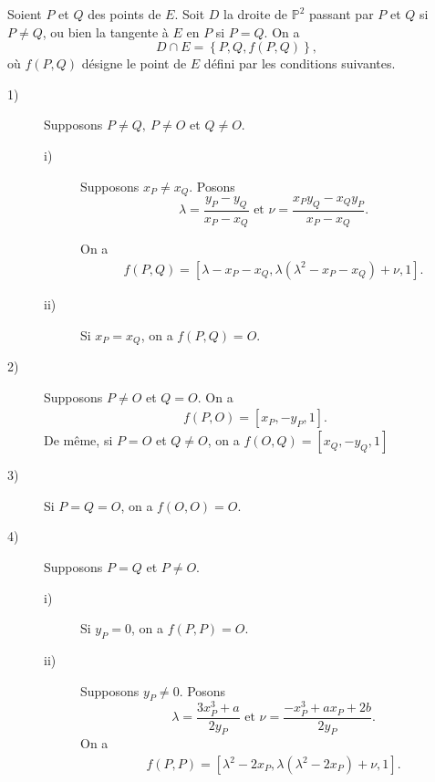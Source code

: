 \begin{proposition}
    \label{prop:secTanAlg}
    
    Soient $P$ et $Q$ des points de $E$. Soit $D$ la droite de $\mathbb{P}^2$ passant par $P$ et $Q$ si $P \neq Q$, ou bien la tangente à $E$ en $P$ si $P = Q$. On a
    \[
    D \cap E = \left\{ P, Q, f(P,Q) \right\}
    ,\] 
    où $f(P,Q)$ désigne le point de $E$ défini par les conditions suivantes.
    \begin{description}
        \item[1)] Supposons $P \neq Q, \ P \neq O$ et $Q \neq O$.
            \begin{description}
                \item[i)] Supposons $x_{P} \neq x_{Q}$. Posons
                    \[
                    \lambda = \frac{y_{P} - y_{Q}}{x_{P} - x_{Q}} \text{ et } \nu = \frac{x_{P}y_{Q} - x_{Q}y_{P}}{x_{P} - x_{Q}}
                    .\] 

On a 
\begin{align}
    \label{eq:interne1}
f(P,Q) = \left[ \lambda - x_{P} - x_{Q}, \lambda \left( \lambda^2 - x_{P} - x_{Q} \right) + \nu, 1 \right]
.\end{align}
                \item[ii)] Si $x_{P} = x_{Q}$, on a $f(P,Q) = O$.
            \end{description}
        \item[2)] Supposons $P \neq O$ et $Q = O$. On a
            \begin{align}
                \label{eq:interne2}
            f(P,O) = \left[ x_{P}, -y_{P}, 1 \right]
            .\end{align}
            De même, si $P = O$ et $Q \neq O$, on a $f(O,Q) = \left[ x_{Q}, -y_{Q}, 1 \right]$
        \item[3)] Si $P = Q = O$, on a $f(O,O) = O$.
        \item[4)]  Supposons $P = Q$ et $P \neq O$.
            \begin{description}
                \item[i)] Si $y_{P} = 0$, on a $f(P,P) = O$.
                \item[ii)] Supposons $y_{P} \neq 0$. Posons
                    \[
                    \lambda = \frac{3x_{P}^3 + a}{2y_{P}} \text{ et } \nu = \frac{-x_{P}^3 + ax_{P} + 2b}{2y_{P}}
                    .\] 
On a
\begin{align}
    \label{eq:interne3}
f(P,P) = \left[ \lambda^2 - 2 x_{P}, \lambda\left( \lambda^2 - 2x_{P} \right) + \nu, 1 \right]
.\end{align}
            \end{description}
    \end{description}
\end{proposition}

